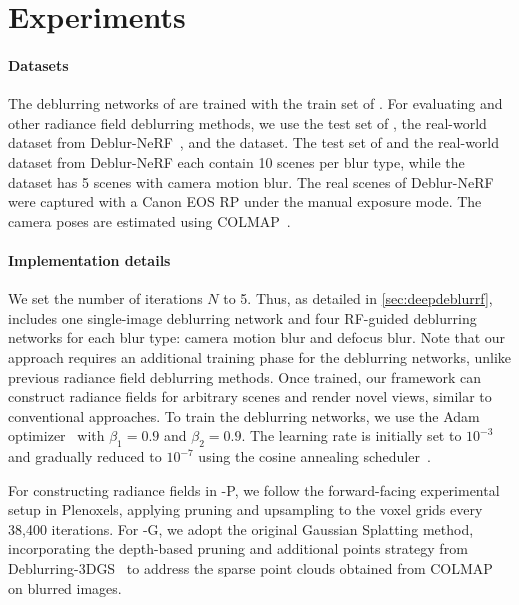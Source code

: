 \section{Experiments}
\label{sec:experiments}
\paragraph{Datasets}
The deblurring networks of \MethodName{} are trained with the train set of \SynthDataName{}.
For evaluating \MethodName{} and other radiance field deblurring methods, we use the test set of \SynthDataName{}, the real-world dataset from Deblur-NeRF~\cite{ma2022deblurnerf}, and the \RealDataName{} dataset.
The test set of \SynthDataName{} and the real-world dataset from Deblur-NeRF each contain 10 scenes per blur type, while the \RealDataName{} dataset has 5 scenes with camera motion blur.
The real scenes of Deblur-NeRF were captured with a Canon EOS RP under the manual exposure mode.
The camera poses are estimated using COLMAP~\cite{schoenberger2016sfm}.


\paragraph{Implementation details}
\label{Implementation_Details}
We set the number of iterations $N$ to 5.
Thus, as detailed in \cref{sec:deepdeblurrf}, \MethodName{} includes one single-image deblurring network and four RF-guided deblurring networks for each blur type: camera motion blur and defocus blur.
Note that our approach requires an additional training phase for the deblurring networks, unlike previous radiance field deblurring methods.
Once trained, our framework can construct radiance fields for arbitrary scenes and render novel views, similar to conventional approaches.
To train the deblurring networks, we use the Adam optimizer~\cite{kingma2014adam} with $\beta_1 = 0.9$ and $\beta_2 = 0.9$. 
The learning rate is initially set to $10^{-3}$ and gradually reduced to $10^{-7}$ using the cosine annealing scheduler~\cite{loshchilov2016sgdr}.

For constructing radiance fields in \MethodName{}-P, we follow the forward-facing experimental setup in Plenoxels, applying pruning and upsampling to the voxel grids every 38,400 iterations. 
For \MethodName{}-G, we adopt the original Gaussian Splatting method, incorporating the depth-based pruning and additional points strategy from Deblurring-3DGS~\cite{lee2024deblurring} to address the sparse point clouds obtained from COLMAP on blurred images.

